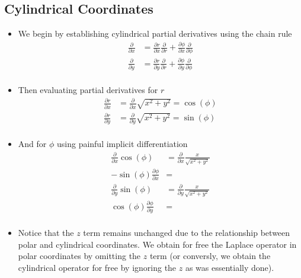 \documentclass{article}
\begin{document}
\subsection{Cylindrical Coordinates}
\begin{itemize}
    \item We begin by establishing cylindrical partial derivatives using the chain rule
        \begin{align}
            \frac{\partial}{\partial x} &= \frac{\partial r}{\partial x}\frac{\partial}{\partial r} +
 \frac{\partial \phi}{\partial x}\frac{\partial}{\partial \phi} \\
            \frac{\partial}{\partial y} &= \frac{\partial r}{\partial y}\frac{\partial}{\partial r} +
 \frac{\partial \phi}{\partial y}\frac{\partial}{\partial \phi} \\
        \end{align}
    \item Then evaluating partial derivatives for $r$
        \begin{align}
            \frac{\partial r}{\partial x} &= \frac{\partial}{\partial x}\sqrt{x^2+y^2} = \cos{(\phi)} \\
            \frac{\partial r}{\partial y} &= \frac{\partial}{\partial y}\sqrt{x^2+y^2} = \sin{(\phi)} \\
        \end{align}
    \item And for $\phi$ using painful implicit differentiation
        \begin{align}
            \frac{\partial}{\partial x}\cos{(\phi)} &= \frac{\partial}{\partial x}\frac{x}{\sqrt{x^2+y^2}}\\
            -\sin{(\phi)}\frac{\partial \phi}{\partial x} &=  \\
            \frac{\partial}{\partial y}\sin{(\phi)} &= \frac{\partial}{\partial y}\frac{x}{\sqrt{x^2+y^2}}\\
            \cos{(\phi)}\frac{\partial \phi}{\partial y} &=  \\
        \end{align}
    \item Notice that the $z$ term remains unchanged due to the relationship between polar and cylindrical coordinates. We obtain for free the Laplace operator in polar coordinates by omitting the $z$ term (or conversly, we obtain the cylindrical operator for free by ignoring the $z$ as was essentially done).
\end{itemize}
\end{document}

